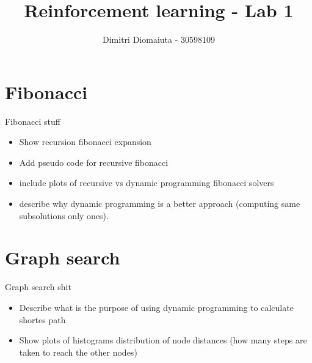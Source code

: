 \documentclass[runningheads]{llncs}
\begin{document}
%
\title{Reinforcement learning - Lab 1}
%
%
\author{Dimitri Diomaiuta - 30598109}
%
%
%
\maketitle              %
%
%
%
%

\section{Fibonacci}
Fibonacci stuff
\begin{itemize}
\item Show recursion fibonacci expansion
\item Add pseudo code for recursive fibonacci
\item include plots of recursive vs dynamic programming fibonacci
  solvers
\item describe why dynamic programming is a better approach (computing
  same subsolutions only ones).
\end{itemize}
    


\section{Graph search}
Graph search shit
\begin{itemize}
\item Describe what is the purpose of using dynamic programming to
  calculate shortes path
\item Show plots of histograms distribution of node distances (how
  many steps are taken to reach the other nodes)
\end{itemize}
\end{document}
